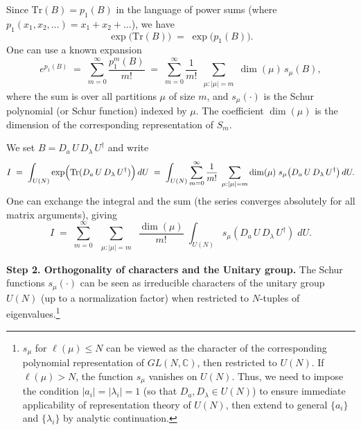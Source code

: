 \documentclass[letterpaper,11pt,oneside,reqno]{article}
\numberwithin{equation}{section}
\theoremstyle{definition}
\begin{document}
Since \(\mathrm{Tr}(B) = p_1(B)\) in the language of power sums
(where \(p_1(x_1,x_2,\dots) = x_1 + x_2 + \dots\)),
we have
\[
\exp\bigl(\mathrm{Tr}(B)\bigr) \;=\; \exp\bigl(p_1(B)\bigr).
\]
One can use a known expansion
\cite{Macdonald1995}
\[
e^{p_1(B)} \;=\;
\sum_{m=0}^{\infty} \frac{p_1^m(B)}{m!}
\;=\;
\sum_{m=0}^\infty \frac{1}{m!}\,
\sum_{\substack{\mu: |\mu|=m}}
\dim(\mu)\,s_\mu(B),
\]
where the sum is over all partitions \(\mu\) of size \(m\),
and \(s_\mu(\cdot)\) is the Schur polynomial (or Schur function) indexed by \(\mu\).  The coefficient \(\dim(\mu)\) is the dimension of the corresponding representation of \(S_m\).

We set \(B = D_a\,U\,D_\lambda\,U^\dagger\) and write
\[
I \;=\;
\int_{U(N)}
\exp\Bigl(\mathrm{Tr}(D_a\,U\,D_\lambda\,U^\dagger)\Bigr)\,dU
\;=\;
\int_{U(N)}
\sum_{m=0}^\infty
\frac{1}{m!}
\;\sum_{\substack{\mu:|\mu|=m}}
\dim(\mu)\;
s_\mu\bigl(D_a\,U\,D_\lambda\,U^\dagger\bigr)\,dU.
\]
One can exchange the integral and the sum (the series converges absolutely for all matrix arguments), giving
\begin{equation}
	\label{eq:HCIZ-I-start}
	I
	\;=\;
	\sum_{m=0}^\infty\;
	\sum_{\substack{\mu:|\mu|=m}}\;
	\frac{\dim(\mu)}{m!}
	\;\int_{U(N)} s_\mu(D_a\,U\,D_\lambda\,U^\dagger)\;dU.
\end{equation}

\smallskip

\noindent
\textbf{Step 2. Orthogonality of characters and the Unitary group.}
The Schur functions \(s_\mu(\cdot)\) can be seen as irreducible characters of the unitary group \(U(N)\) (up to a normalization factor) when restricted to \(N\)-tuples of eigenvalues.\footnote{$s_\mu$ for $\ell(\mu)\le N$ can be viewed as the character of the corresponding polynomial representation of $GL(N,\mathbb{C})$, then restricted to $U(N)$.  If $\ell(\mu) > N$, the function $s_\mu$ vanishes on $U(N)$. Thus,
we need to impose the condition \(|a_i|=|\lambda_i|=1\) (so that \(D_a,D_\lambda\in U(N)\)) to ensure immediate applicability of representation theory of $U(N)$, then extend to general \(\{a_i\}\) and \(\{\lambda_i\}\) by analytic continuation.}
\end{document}
